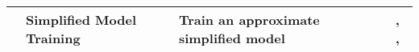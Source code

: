 \begin{table}[htbp]
{\begin{tabular}{@{}clll@{}}
                                   & Simplified Model Training                    & Train an approximate simplified model                                                                                                             & \citet{Markov_24_arXiv_Harvard}, \citet{IterationHead_24_arXiv_Meta}, \citet{MathFrame_21_TCT_Anthropic}                                                                                                                        \\ \bottomrule
\end{tabular}%
}
\end{table}